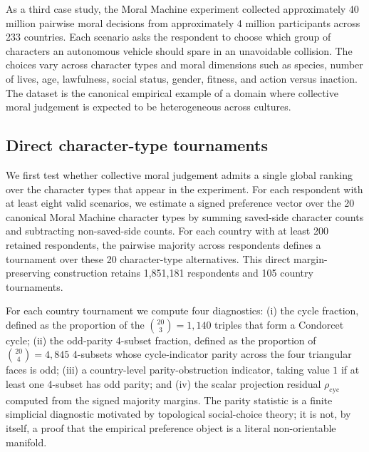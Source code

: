 \documentclass[10pt]{article}
\theoremstyle{definition}
\theoremstyle{remark}
\begin{document}
As a third case study, the Moral Machine experiment\cite{awad2018} collected approximately 40 million pairwise moral decisions from approximately 4 million participants across 233 countries. Each scenario asks the respondent to choose which group of characters an autonomous vehicle should spare in an unavoidable collision. The choices vary across character types and moral dimensions such as species, number of lives, age, lawfulness, social status, gender, fitness, and action versus inaction. The dataset is the canonical empirical example of a domain where collective moral judgement is expected to be heterogeneous across cultures.

\subsection{Direct character-type tournaments}

We first test whether collective moral judgement admits a single global ranking over the character types that appear in the experiment. For each respondent with at least eight valid scenarios, we estimate a signed preference vector over the 20 canonical Moral Machine character types by summing saved-side character counts and subtracting non-saved-side counts. For each country with at least 200 retained respondents, the pairwise majority across respondents defines a tournament over these 20 character-type alternatives. This direct margin-preserving construction retains 1,851,181 respondents and 105 country tournaments.

For each country tournament we compute four diagnostics: (i) the cycle fraction, defined as the proportion of the $\binom{20}{3}=1{,}140$ triples that form a Condorcet cycle; (ii) the odd-parity 4-subset fraction, defined as the proportion of $\binom{20}{4}=4{,}845$ 4-subsets whose cycle-indicator parity across the four triangular faces is odd; (iii) a country-level parity-obstruction indicator, taking value $1$ if at least one 4-subset has odd parity; and (iv) the scalar projection residual $\rho_{\mathrm{cyc}}$ computed from the signed majority margins. The parity statistic is a finite simplicial diagnostic motivated by topological social-choice theory; it is not, by itself, a proof that the empirical preference object is a literal non-orientable manifold.
\end{document}
